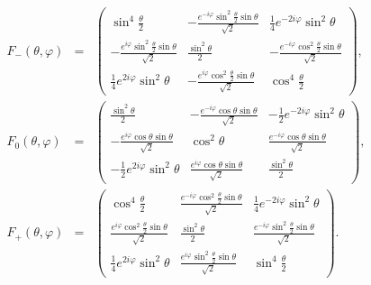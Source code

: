 \documentclass[pra,amsfonts,showpacs,showkeys,preprint]{revtex4}
\begin{document}
\begin{equation}
\begin{array}{rcl}
F_{-}(\theta ,\varphi) &=&
\left(
\begin{array}{ccc}
\sin ^4\frac{\theta }{2} & -\frac{e^{-i \varphi } \sin ^2\frac{\theta }{2} \sin \theta }{\sqrt{2}} & \frac{1}{4} e^{-2 i \varphi } \sin ^2\theta  \\
 -\frac{e^{i \varphi } \sin ^2\frac{\theta }{2} \sin \theta }{\sqrt{2}} & \frac{\sin ^2\theta }{2} & -\frac{e^{-i \varphi } \cos^2 \frac{\theta}{2} \sin \theta }{\sqrt{2}} \\
 \frac{1}{4} e^{2 i \varphi } \sin ^2\theta  & -\frac{e^{i \varphi } \cos^2 \frac{\theta}{2} \sin \theta }{ \sqrt{2}} & \cos ^4\frac{\theta }{2}
\end{array}
\right),
   \\
F_{0}(\theta ,\varphi) &=&
 \left(
\begin{array}{ccc}
\frac{\sin ^2\theta }{2} & -\frac{e^{-i \varphi } \cos \theta  \sin \theta }{\sqrt{2}} & -\frac{1}{2} e^{-2 i \varphi } \sin ^2\theta  \\
 -\frac{e^{i \varphi } \cos \theta  \sin \theta }{\sqrt{2}} & \cos ^2\theta  & \frac{e^{-i \varphi } \cos \theta  \sin \theta }{\sqrt{2}} \\
 -\frac{1}{2} e^{2 i \varphi } \sin ^2\theta  & \frac{e^{i \varphi } \cos \theta  \sin \theta }{\sqrt{2}} & \frac{\sin ^2\theta }{2}
\end{array}
\right),
\\
F_{+}(\theta ,\varphi) &=&
 \left(
\begin{array}{ccc}
\cos ^4\frac{\theta }{2} & \frac{e^{-i \varphi } \cos^2 \frac{\theta}{2} \sin \theta }{ \sqrt{2}} & \frac{1}{4} e^{-2 i \varphi } \sin ^2\theta  \\
 \frac{e^{i \varphi } \cos^2 \frac{\theta}{2} \sin \theta }{ \sqrt{2}} & \frac{\sin ^2\theta }{2} & \frac{e^{-i \varphi } \sin ^2\frac{\theta }{2} \sin \theta }{\sqrt{2}} \\
 \frac{1}{4} e^{2 i \varphi } \sin ^2\theta  & \frac{e^{i \varphi } \sin ^2\frac{\theta }{2} \sin \theta }{\sqrt{2}} & \sin ^4\frac{\theta }{2}
\end{array}
\right)
.
\end{array}
\label{e-2009-gtq-s2f}
\end{equation}
\end{document}
